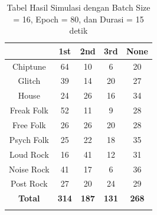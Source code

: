 \begin{longtable}[c]{|c|c|c|c|c|}
	\hline
	\textbf{}      & \textbf{1st} & \textbf{2nd} & \textbf{3rd} & \textbf{None} \\ \hline
	\endfirsthead
	\endhead
	Chiptune       & 64           & 10           & 6            & 20            \\ \hline
	Glitch         & 39           & 14           & 20           & 27            \\ \hline
	House          & 24           & 26           & 16           & 34            \\ \hline
	Freak Folk     & 52           & 11           & 9            & 28            \\ \hline
	Free Folk      & 26           & 26           & 20           & 28            \\ \hline
	Psych Folk     & 25           & 22           & 18           & 35            \\ \hline
	Loud Rock      & 16           & 41           & 12           & 31            \\ \hline
	Noise Rock     & 41           & 17           & 6            & 36            \\ \hline
	Post Rock      & 27           & 20           & 24           & 29            \\ \hline
	\textbf{Total} & \textbf{314} & \textbf{187} & \textbf{131} & \textbf{268}  \\ \hline
	\caption{Tabel Hasil Simulasi dengan Batch Size = 16, Epoch = 80, dan Durasi = 15 detik}
	\label{tab:my-table}\\
\end{longtable}

